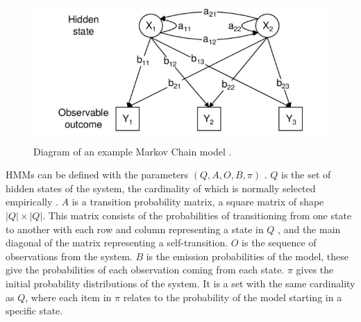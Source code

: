 \documentclass{article}
\begin{document}
\begin{figure}[ht!]
    \centering
    \includegraphics[scale=1.5]{Images/HMM-Paper-Diagram.png}
    \caption{Diagram of an example Markov Chain model \cite{choudhury2007state}.}
    \label{fig:Markov}
\end{figure}

HMMs can be defined with the parameters $(Q,A,O,B,\pi)$ \cite{jurafsky2018speech}.
$Q$ is the set of hidden states of the system, the cardinality of which is normally selected empirically \cite{ibe2013markov}.
$A$ is a transition probability matrix, a square matrix of shape $|Q|\times|Q|$.
This matrix consists of the probabilities of transitioning from one state to another with each row and column representing a state in $Q$
, and the main diagonal of the matrix representing a self-transition.
$O$ is the sequence of observations from the system.
$B$ is the emission probabilities of the model, these give the probabilities of each observation coming from each state.
$\pi$ gives the initial probability distributions of the system.
It is a set with the same cardinality as $Q$, where each item in $\pi$ relates to the probability of the model starting in a specific state.



\end{document}
